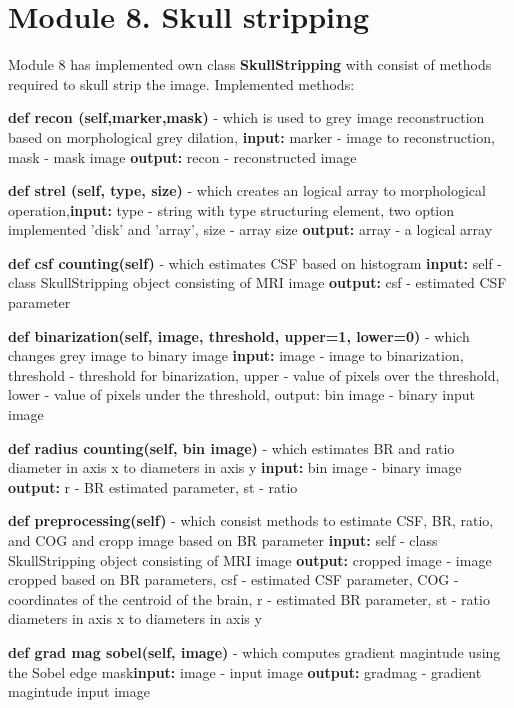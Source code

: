 \section{Module 8. Skull stripping}
Module 8 has implemented own class \textbf{SkullStripping} with consist of methods required to skull strip the image.
Implemented methods:
\begin{itemize}
    \item {\textbf{def recon (self,marker,mask)} - which is used to grey image reconstruction based on morphological grey dilation, \textbf{input:} marker - image to reconstruction, mask - mask image \textbf{output:} recon - reconstructed image}
    \item {\textbf{def strel (self, type, size)} - which creates an logical array to morphological operation,\textbf{input:} type - string with type structuring element, two option implemented 'disk' and 'array', size - array size \textbf{output:} array - a logical array}
    \item {\textbf{def csf counting(self)} - which estimates CSF based on histogram \textbf{input:} self - class SkullStripping object consisting of MRI image  \textbf{output:}  csf - estimated CSF parameter}
    \item {\textbf{def binarization(self, image, threshold, upper=1, lower=0)} - which changes grey image to binary image
    \textbf{input:} image - image to binarization, threshold - threshold for binarization, upper - value of pixels over the threshold, lower - value of pixels under the threshold, output: bin image - binary input image}
    \item {\textbf{def radius counting(self, bin image)} - which estimates BR and ratio diameter in axis x to diameters in axis y \textbf{input:} bin image - binary image \textbf{output:} r - BR estimated parameter, st - ratio}
    \item {\textbf{def preprocessing(self)} - which consist methods to estimate CSF, BR, ratio, and COG and cropp image based on BR parameter \textbf{input:} self - class SkullStripping object consisting of MRI image \textbf{output:} cropped image - image cropped based on BR parameters, csf - estimated CSF parameter, COG - coordinates of the centroid of the brain, r - estimated BR parameter, st - ratio diameters in axis x to diameters in axis y
    \item {\textbf{def grad mag sobel(self, image)} - which computes gradient magintude using the Sobel edge mask\textbf{input:} image - input image \textbf{output:}  gradmag - gradient magintude input image}
}
\end{itemize}
